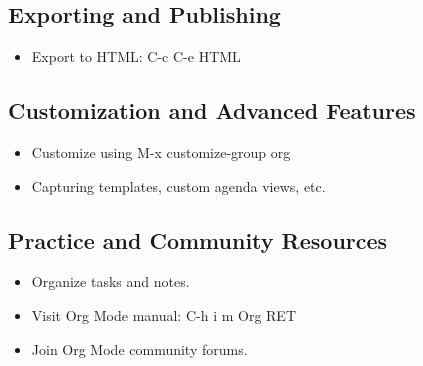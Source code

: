 \documentclass[11pt]{article}
\begin{document}
\subsection{Exporting and Publishing}
\label{sec:orga149ac8}
\begin{itemize}
\item Export to HTML: C-c C-e HTML
\end{itemize}

\subsection{Customization and Advanced Features}
\label{sec:org3e0a6cb}
\begin{itemize}
\item Customize using M-x customize-group org
\item Capturing templates, custom agenda views, etc.
\end{itemize}

\subsection{Practice and Community Resources}
\label{sec:orgbb77b67}
\begin{itemize}
\item Organize tasks and notes.
\item Visit Org Mode manual: C-h i m Org RET
\item Join Org Mode community forums.
\end{itemize}
\end{document}
